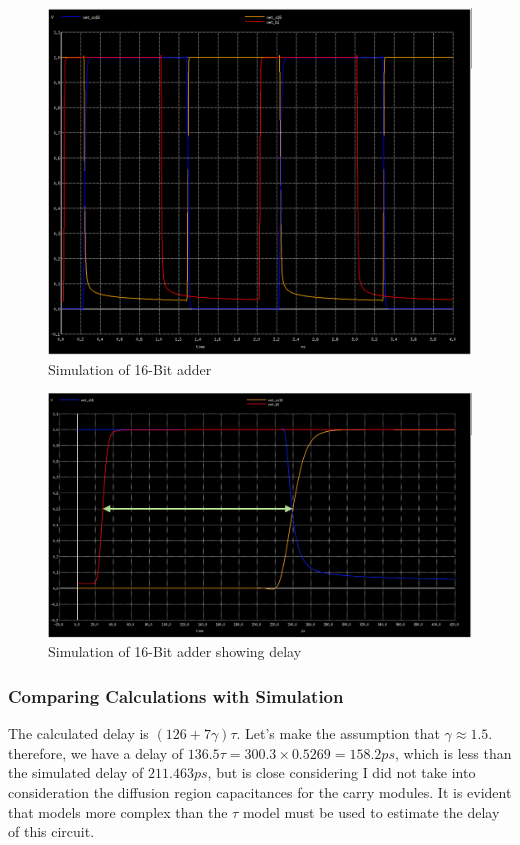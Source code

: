 \documentclass{article}
\begin{document}
\begin{figure}[H]
  \includegraphics[width=\linewidth]{opt_screenshots/opt_16b_adder_delay_waveform.png}
  \caption{Simulation of 16-Bit adder}
  \label{fig:opt_16b_adder_delay_waveform}
\end{figure}

\begin{figure}[H]
  \includegraphics[width=\linewidth]{opt_screenshots/opt_16b_adder_delay_waveform_zoom.png}
  \caption{Simulation of 16-Bit adder showing delay}
  \label{fig:opt_16b_adder_delay_waveform_zoom}
\end{figure}

\subsubsection{Comparing Calculations with Simulation}
The calculated delay is $(126 + 7\gamma)\tau$. Let's make the assumption that $\gamma \approx 1.5$. therefore, we have a delay of $136.5\tau = 300.3 \times 0.5269 = 158.2ps$, which is less than the simulated delay of $211.463ps$, but is close considering I did not take into consideration the diffusion region capacitances for the carry modules. It is evident that models more complex than the $\tau$ model must be used to estimate the delay of this circuit. 
\end{document}
